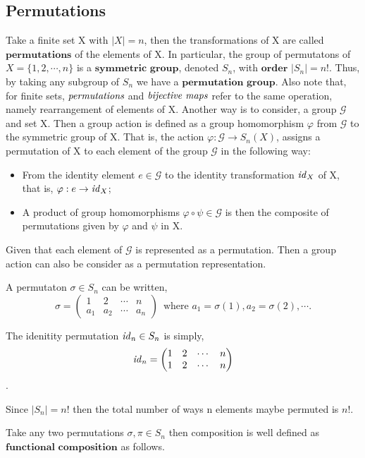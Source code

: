 \subsection{Permutations} %
\label{sec:permutations}
Take a finite set X with $|X|=n$, then the transformations of X are called $\textbf{permutations}$ of the
elements of X. In particular, the group of permutatons of $X=\{ 1, 2, \cdots, n \}$ is a $\textbf{symmetric group}$,
denoted $S_n$, with $\textbf{order}$ $|S_n|=n!$. Thus, by taking any subgroup of $S_n$ we have a
$\textbf{permutation group}$. Also note that, for finite sets, $\emph{permutations}$ and $\emph{bijective maps}$
refer to the same operation, namely rearrangement of elements of X.
Another way is to consider, a group $\mathcal{G}$ and set X.
Then a group action is defined as a group homomorphism $\varphi$ from $\mathcal{G}$ to the symmetric group of X.
That is, the action $\varphi: \mathcal{G} \to S_n(X)$, assigns a permutation of X to each element of the group $\mathcal{G}$ in the following way:
\begin{itemize}
 \item From the identity element $e \in \mathcal{G}$ to the identity transformation $\mathit{id}_{X}$ of X, that is, $\varphi : e \to \mathit{id}_{X}$;
 \item A product of group homomorphisms $\varphi \circ \psi \in \mathcal{G}$ is then the composite of permutations given by $\varphi$ and $\psi$ in X.
\end{itemize}
Given that each element of $\mathcal{G}$ is represented as a permutation. Then a group action can also be consider as a permutation representation.

A permutaton $\sigma \in S_n$ can be written,
\[
 \sigma =
 \begin{pmatrix}
  1 & 2 & \cdots & n \\
  a_1 & a_2 & \cdots & a_n
 \end{pmatrix}
 \, \, \,
 \text{where } a_1 = \sigma(1), a_2 = \sigma(2), \cdots .
\]

The idenitity permutation $\mathit{id}_{n} \in S_n$ is simply,
\[
 \mathit{id}_{n} =
 \begin{pmatrix}
  1 & 2 & \cdots & n \\
  1 & 2 & \cdots & n
 \end{pmatrix}
\].

Since $|S_n|=n!$ then the total number of ways n elements maybe permuted is $n!$.

Take any two permutations $\sigma,\pi \in S_n$ then composition is well defined as $\textbf{functional composition}$
as follows.

